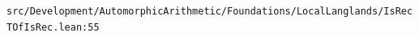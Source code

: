 \nolinkurl{src/Development/AutomorphicArithmetic/Foundations/LocalLanglands/IsRecTOfIsRec.lean:55}%
